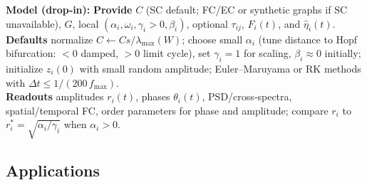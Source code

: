\documentclass[12pt]{article}
\numberwithin{equation}{section}
\begin{document}
\begin{tcolorbox}[
  colback=gray!5,
  colframe=slate,
  colbacktitle=softblue!25,
  coltitle=softblue!60!black,
  fonttitle=\bfseries\small,
  title={\small How to Use It},
  boxrule=0.4pt, enhanced, sharp corners,
  left=4pt,right=4pt,top=3pt,bottom=3pt,
  boxsep=2pt, before skip=6pt, after skip=6pt
]
\scriptsize
\textbf{Model (drop‑in):}
\textbf{Provide} $C$ (SC default; FC/EC or synthetic graphs if SC unavailable), $G$, local $(\alpha_i,\omega_i,\gamma_i>0,\beta_i)$, optional $\tau_{ij}$, $F_i(t)$, and $\hat \eta_i(t)$.\\
\textbf{Defaults} normalize $
C\!\leftarrow\!Cs /\lambda_{\max}(W)$; choose small $\alpha_i$ (tune distance to Hopf bifurcation: $<0$ damped, $>0$ limit cycle), set $\gamma_i{=}1$ for scaling, $\beta_i\approx 0$ initially; initialize $z_i(0)$ with small random amplitude; Euler–Maruyama or RK methods with $\Delta t\!\le\!1/(200\,f_{\max})$.\\
\textbf{Readouts} amplitudes $r_i(t)$, phases $\theta_i(t)$, PSD/cross‑spectra, spatial/temporal FC, order parameters for phase and amplitude; compare $r_i$ to $r_i^{*}=\sqrt{\alpha_i/\gamma_i}$ when $\alpha_i>0$.
\end{tcolorbox}

\subsection{Applications}
\end{document}
